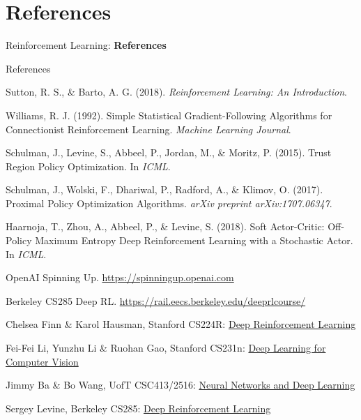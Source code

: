 \section{References}
\begin{frame}{}
    \LARGE Reinforcement Learning: \textbf{References}
\end{frame}

\begin{frame}[allowframebreaks]{References}
    \begin{thebibliography}{99}
        Sutton, R. S., \& Barto, A. G. (2018).
        \newblock \emph{Reinforcement Learning: An Introduction}.

        Williams, R. J. (1992).
        \newblock Simple Statistical Gradient-Following Algorithms for Connectionist Reinforcement Learning.
        \newblock \emph{Machine Learning Journal}.

        Schulman, J., Levine, S., Abbeel, P., Jordan, M., \& Moritz, P. (2015).
        \newblock Trust Region Policy Optimization.
        \newblock In \emph{ICML}.

        Schulman, J., Wolski, F., Dhariwal, P., Radford, A., \& Klimov, O. (2017).
        \newblock Proximal Policy Optimization Algorithms.
        \newblock \emph{arXiv preprint arXiv:1707.06347}.

        Haarnoja, T., Zhou, A., Abbeel, P., \& Levine, S. (2018).
        \newblock Soft Actor-Critic: Off-Policy Maximum Entropy Deep Reinforcement Learning with a Stochastic Actor.
        \newblock In \emph{ICML}.

        OpenAI Spinning Up.
        \newblock \url{https://spinningup.openai.com}

        Berkeley CS285 Deep RL.
        \newblock \url{https://rail.eecs.berkeley.edu/deeprlcourse/}

        Chelsea Finn \& Karol Hausman, Stanford CS224R: \href{http://cs224r.stanford.edu/}{Deep Reinforcement Learning}

        Fei-Fei Li, Yunzhu Li \& Ruohan Gao, Stanford CS231n: \href{http://cs231n.stanford.edu/}{Deep Learning for Computer Vision}

        Jimmy Ba \& Bo Wang, UofT CSC413/2516: \href{https://uoft-csc413.github.io/2022/}{Neural Networks and Deep Learning}

        Sergey Levine, Berkeley CS285: \href{https://rail.eecs.berkeley.edu/deeprlcourse-fa21/}{Deep Reinforcement Learning}
    \end{thebibliography}
\end{frame}
